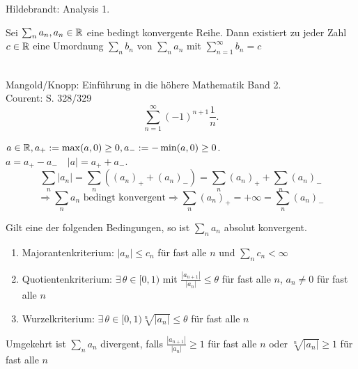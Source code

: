 \documentclass[../ana1.tex]{subfiles}
\begin{document}
\begin{bew}
    Hildebrandt: Analysis 1.
\end{bew}
\begin{satz*}[Riemann]
    Sei \( \sum_n a_n, a_n \in\mathbb{R} \) eine bedingt konvergente Reihe. Dann existiert zu jeder Zahl \( c\in\mathbb{R} \) eine Umordnung \( \sum_n b_n \) von \( \sum_n a_n \) mit \( \sum_{n=1}^\infty b_n = c \)
\end{satz*}
\begin{bspe}\leavevmode \\
    Mangold/Knopp: Einführung in die höhere Mathematik Band 2.\\
    Courent:  S. 328/329
    \[ \sum_{n=1}^\infty {(-1)}^{n+1} \frac{1}{n}. \]
\end{bspe}
\begin{bem}
    \( a\in\mathbb{R}, a_+ := \max(a,0) \geq 0, a_- := -\min(a,0)\geq 0 \).\\
    \( a = a_+ - a_- \quad |a| = a_+ + a_- \).
    \[ \sum_n |a_n| = \sum_n \left( {(a_n)}_+ + {(a_n)}_- \right) = \sum_n {(a_n)}_+ + \sum_n {(a_n)}_- \]
    \[ \Rightarrow \sum_n a_n \text{ bedingt konvergent} \Rightarrow \sum_n {(a_n)}_+ = +\infty = \sum_n {(a_n)}_- \]
\end{bem}
\begin{satz}
    Gilt eine der folgenden Bedingungen, so ist \( \sum_n a_n \) absolut konvergent.
    \begin{enumerate}
        \item Majorantenkriterium: \( |a_n| \leq c_n \) für fast alle \(n\) und \( \sum_n c_n < \infty \)
        \item Quotientenkriterium: \( \exists\, \theta \in [0,1) \) mit \( \frac{|a_{n+1}|}{|a_n|} \leq \theta \) für fast alle \(n\), \(a_n \neq 0\) für fast alle \(n\)
        \item Wurzelkriterium: \( \exists \, \theta \in [0,1) \sqrt[n]{|a_n|} \leq \theta \) für fast alle \(n\)
    \end{enumerate}
    Umgekehrt ist \( \sum_n a_n \) divergent, falls \( \frac{|a_{n+1}|}{|a_n|} \geq 1 \) für fast alle \(n\) oder \( \sqrt[n]{|a_n|} \geq 1 \) für fast alle \(n\)
\end{satz}
\end{document}
